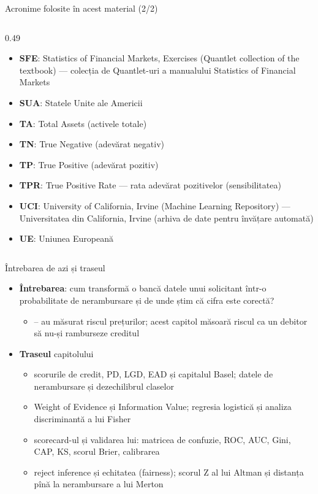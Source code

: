 \begin{frame}{Acronime folosite în acest material (2/2)}
\begin{columns}[T]
\begin{column}{0.49\textwidth}
\begin{itemize}
    \item \textbf{SFE}: Statistics of Financial Markets, Exercises (Quantlet collection of the textbook) — colecția de Quantlet-uri a manualului Statistics of Financial Markets
    \item \textbf{SUA}: Statele Unite ale Americii
    \item \textbf{TA}: Total Assets (activele totale)
    \item \textbf{TN}: True Negative (adevărat negativ)
    \item \textbf{TP}: True Positive (adevărat pozitiv)
    \item \textbf{TPR}: True Positive Rate — rata adevărat pozitivelor (sensibilitatea)
    \item \textbf{UCI}: University of California, Irvine (Machine Learning Repository) — Universitatea din California, Irvine (arhiva de date pentru învățare automată)
    \item \textbf{UE}: Uniunea Europeană
\end{itemize}
\end{column}
\end{columns}
\end{frame}

\begin{frame}{Întrebarea de azi și traseul}
\itemsize{\small}
\begin{itemize}
    \item \textbf{Întrebarea}: cum transformă o bancă datele unui solicitant într-o probabilitate de nerambursare și de unde știm că cifra este corectă?
    \begin{itemize}
        \item {}-- au măsurat riscul prețurilor; acest capitol măsoară riscul ca un debitor să nu-și ramburseze creditul
    \end{itemize}
    \item \textbf{Traseul} capitolului
    \begin{itemize}
        \item scorurile de credit, PD, LGD, EAD și capitalul Basel; datele de nerambursare și dezechilibrul claselor
        \item Weight of Evidence și Information Value; regresia logistică și analiza discriminantă a lui Fisher
        \item scorecard-ul și validarea lui: matricea de confuzie, ROC, AUC, Gini, CAP, KS, scorul Brier, calibrarea
        \item reject inference și echitatea (fairness); scorul Z al lui Altman și distanța pînă la nerambursare a lui Merton
    \end{itemize}
\end{itemize}
\end{frame}

